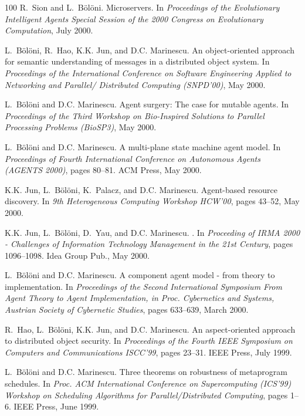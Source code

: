 \begin{thebibliography}{100}
R.~Sion and L.~Bölöni.
\newblock Microservers.
\newblock In {\em Proceedings of the Evolutionary Intelligent Agents Special
  Session of the 2000 Congress on Evolutionary Computation}, July 2000.

L.~Bölöni, R.~Hao, K.K. Jun, and D.C. Marinescu.
\newblock An object-oriented approach for semantic understanding of messages in
  a distributed object system.
\newblock In {\em Proceedings of the International Conference on Software
  Engineering Applied to Networking and Parallel/ Distributed Computing
  (SNPD'00)}, May 2000.

L.~Bölöni and D.C. Marinescu.
\newblock Agent surgery: The case for mutable agents.
\newblock In {\em Proceedings of the Third Workshop on Bio-Inspired Solutions
  to Parallel Processing Problems (BioSP3)}, May 2000.

L.~Bölöni and D.C. Marinescu.
\newblock A multi-plane state machine agent model.
\newblock In {\em Proceedings of Fourth International Conference on Autonomous
  Agents (AGENTS 2000)}, pages 80--81. ACM Press, May 2000.

K.K. Jun, L.~Bölöni, K.~Palacz, and D.C. Marinescu.
\newblock Agent-based resource discovery.
\newblock In {\em 9th Heterogeneous Computing Workshop HCW'00}, pages 43--52,
  May 2000.

K.K. Jun, L.~Bölöni, D.~Yau, and D.C. Marinescu.
.
\newblock In {\em Proceeding of IRMA 2000 - Challenges of Information
  Technology Management in the 21st Century}, pages 1096--1098. Idea Group
  Pub., May 2000.

L.~Bölöni and D.C. Marinescu.
\newblock A component agent model - from theory to implementation.
\newblock In {\em Proceedings of the Second International Symposium From Agent
  Theory to Agent Implementation, in Proc. Cybernetics and Systems, Austrian
  Society of Cybernetic Studies}, pages 633--639, March 2000.

R.~Hao, L.~Bölöni, K.K. Jun, and D.C. Marinescu.
\newblock An aspect-oriented approach to distributed object security.
\newblock In {\em Proceedings of the Fourth IEEE Symposium on Computers and
  Communications ISCC'99}, pages 23--31. IEEE Press, July 1999.

L.~Bölöni and D.C. Marinescu.
\newblock Three theorems on robustness of metaprogram schedules.
\newblock In {\em Proc. ACM International Conference on Supercomputing (ICS'99)
  Workshop on Scheduling Algorithms for Parallel/Distributed Computing}, pages
  1--6. IEEE Press, June 1999.


\end{thebibliography}
